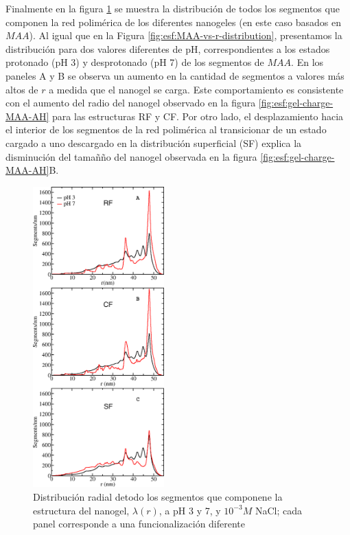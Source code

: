 Finalmente en la figura \ref{fig:esf:allr-distribution} se muestra la distribuci\'on de todos los segmentos que componen la red polim\'erica de los diferentes nanogeles (en este caso basados en $MAA$). Al igual que en la Figura \ref{fig:esf:MAA-vs-r-distribution}, presentamos la distribuci\'on para dos valores diferentes de pH, correspondientes a los estados protonado (pH 3) y desprotonado (pH 7) de los segmentos de $MAA$. En los paneles A y B se observa un aumento en la cantidad de segmentos a valores m\'as altos de $r$ a medida que el nanogel se carga. Este comportamiento es consistente con el aumento del radio del nanogel observado en la figura \ref{fig:esf:gel-charge-MAA-AH} para las estructuras RF y CF. Por otro lado, el desplazamiento hacia el interior de los segmentos de la red polim\'erica al transicionar de un estado cargado a uno descargado en la distribuci\'on superficial (SF) explica la disminuci\'on del tamañ\~no del nanogel observada en la figura \ref{fig:esf:gel-charge-MAA-AH}B.

\begin{figure}[!htb]
	\centering
	\includegraphics[width=0.45\textwidth]{Figures/graphs-gel2/allseg_SI.png}
	\caption{Distribuci\'on radial detodo los segmentos que componene la estructura del nanogel, $\lambda(r)$, a pH 3 y 7, y $10^{-3}M$ NaCl; cada panel corresponde a una funcionalizaci\'on  diferente}
	\label{fig:esf:allr-distribution}
\end{figure}




